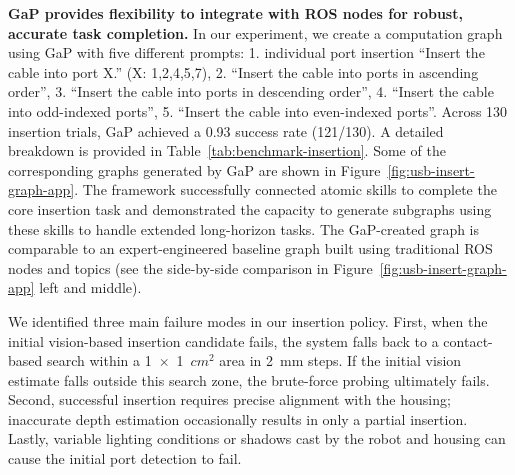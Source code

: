 \textbf{GaP provides flexibility to integrate with ROS nodes for robust, accurate task completion.} In our experiment, we create a computation graph using GaP with five different prompts: 1. individual port insertion ``Insert the cable into port X.'' (X: 1,2,4,5,7), 2. ``Insert the cable into ports in ascending order'', 3. ``Insert the cable into ports in descending order'', 4. ``Insert the cable into odd-indexed ports'', 5. ``Insert the cable into even-indexed ports''. Across 130 insertion trials, GaP achieved a 0.93 success rate (121/130). A detailed breakdown is provided in Table~\ref{tab:benchmark-insertion}. Some of the corresponding graphs generated by GaP are shown in Figure~\ref{fig:usb-insert-graph-app}. The framework successfully connected atomic skills to complete the core insertion task and demonstrated the capacity to generate subgraphs using these skills to handle extended long-horizon tasks. The GaP-created graph is comparable to an expert-engineered baseline graph built using traditional ROS nodes and topics (see the side-by-side comparison in Figure~\ref{fig:usb-insert-graph-app} left and middle). 

We identified three main failure modes in our insertion policy. First, when the initial vision-based insertion candidate fails, the system falls back to a contact-based search within a 1~$\times$~1~$cm^2$ area in 2~mm steps. If the initial vision estimate falls outside this search zone, the brute-force probing ultimately fails. Second, successful insertion requires precise alignment with the housing; inaccurate depth estimation occasionally results in only a partial insertion. Lastly, variable lighting conditions or shadows cast by the robot and housing can cause the initial port detection to fail.

